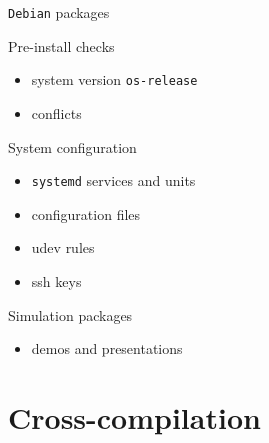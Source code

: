 \documentclass[hyperref={colorlinks=false, breaklinks=true},11pt]{beamer}
\begin{document}
\begin{frame}{\texttt{Debian} packages}

    \begin{block}{Pre-install checks}
        \begin{itemize}
            \item system version \texttt{os-release}
            \item conflicts
        \end{itemize}
    \end{block}

    \begin{block}{System configuration}
        \begin{itemize}
            \item \texttt{systemd} services and units
            \item configuration files
            \item udev rules
            \item ssh keys
        \end{itemize}
    \end{block}

    \begin{block}{Simulation packages}
        \begin{itemize}
            \item demos and presentations
        \end{itemize}
    \end{block}
\end{frame}


\section{Cross-compilation}
\end{document}
